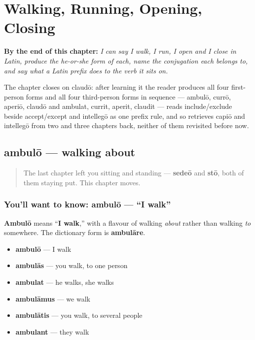 
\chapter{Walking, Running, Opening, Closing}
\label{ch:la-motion-verbs}

\begin{chapteropening}
\textbf{By the end of this chapter:} \emph{I can say I walk, I run, I open and I close in Latin, produce the he-or-she form of each, name the conjugation each belongs to, and say what a Latin prefix does to the verb it sits on.}

The chapter closes on claudō: after learning it the reader produces all four first-person forms and all four third-person forms in sequence — ambulō, currō, aperiō, claudō and ambulat, currit, aperit, claudit — reads include/exclude beside accept/except and intellegō as one prefix rule, and so retrieves capiō and intellegō from two and three chapters back, neither of them revisited before now.
\end{chapteropening}

\section[ambulō, ambulāre]{ambulō — walking about}

\label{lesson:LA-C41-ambulo}



\begin{quote}
The last chapter left you sitting and standing — \textbf{sedeō} and \textbf{stō}, both of them staying put. This chapter moves.
\end{quote}

\subsection*{You'll want to know: ambulō — \textquotedblleft{}I walk\textquotedblright{}}
\textbf{Ambulō} means \textquotedblleft{}\textbf{I walk},\textquotedblright{} with a flavour of walking \emph{about} rather than walking \emph{to} somewhere. The dictionary form is \textbf{ambulāre}.

\begin{itemize}
\raggedright
  \item \textbf{ambulō} — I walk
  \item \textbf{ambulās} — you walk, to one person
  \item \textbf{ambulat} — he walks, she walks
  \item \textbf{ambulāmus} — we walk
  \item \textbf{ambulātis} — you walk, to several people
  \item \textbf{ambulant} — they walk
\end{itemize}

